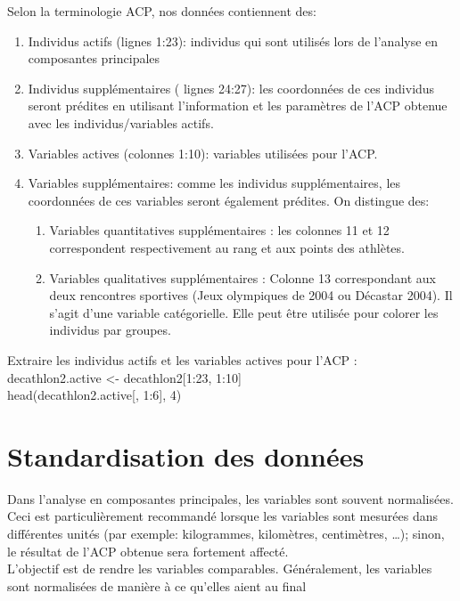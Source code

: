 \documentclass[10pt,a4paper]{report}
\begin{document}
Selon la terminologie ACP, nos données contiennent des:

\begin{enumerate}
\item Individus actifs (lignes 1:23): individus qui sont utilisés lors de l’analyse en composantes principales
\item Individus supplémentaires ( lignes 24:27): les coordonnées de ces individus seront prédites en utilisant l’information et les paramètres de l’ACP obtenue avec les individus/variables actifs.
\item Variables actives (colonnes 1:10): variables utilisées pour l’ACP.
\item  Variables supplémentaires: comme les individus supplémentaires, les coordonnées de ces variables seront également prédites. On distingue des:
\begin{enumerate}
\item Variables quantitatives supplémentaires : les colonnes 11 et 12 correspondent respectivement au rang et aux points des athlètes.
\item  Variables qualitatives supplémentaires : Colonne 13 correspondant aux deux rencontres sportives (Jeux olympiques de 2004 ou Décastar 2004). Il s’agit d’une variable catégorielle. Elle peut être utilisée pour colorer les individus par groupes.

\end{enumerate}

\end{enumerate}

Extraire les individus actifs et les variables actives pour l’ACP : \\

decathlon2.active <- decathlon2[1:23, 1:10] \\

head(decathlon2.active[, 1:6], 4)

\section{Standardisation des données}

Dans l’analyse en composantes principales, les variables sont souvent normalisées. Ceci est particulièrement recommandé lorsque les variables sont mesurées dans différentes unités (par exemple: kilogrammes, kilomètres, centimètres, …); sinon, le résultat de l’ACP obtenue sera fortement affecté.\\

L’objectif est de rendre les variables comparables. Généralement, les variables sont normalisées de manière à ce qu’elles aient au final 
\end{document}
